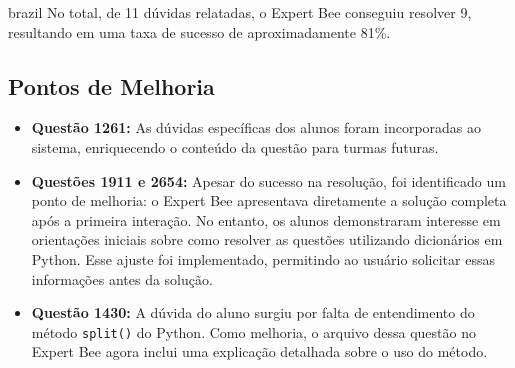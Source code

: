 \begin{otherlanguage*}{brazil}
No total, de 11 dúvidas relatadas, o Expert Bee conseguiu resolver 9, resultando em uma taxa de sucesso de aproximadamente 81\%.  

\subsection{Pontos de Melhoria}  

\begin{itemize}  
    \item \textbf{Questão 1261:} As dúvidas específicas dos alunos foram incorporadas ao sistema, enriquecendo o conteúdo da questão para turmas futuras.  
    \item \textbf{Questões 1911 e 2654:} Apesar do sucesso na resolução, foi identificado um ponto de melhoria: o Expert Bee apresentava diretamente a solução completa após a primeira interação. No entanto, os alunos demonstraram interesse em orientações iniciais sobre como resolver as questões utilizando dicionários em Python. Esse ajuste foi implementado, permitindo ao usuário solicitar essas informações antes da solução.  
    \item \textbf{Questão 1430:} A dúvida do aluno surgiu por falta de entendimento do método \texttt{split()} do Python. Como melhoria, o arquivo dessa questão no Expert Bee agora inclui uma explicação detalhada sobre o uso do método.  
\end{itemize}  

\end{otherlanguage*}

